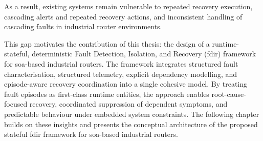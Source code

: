 As a result, existing systems remain vulnerable to repeated recovery execution, cascading alerts and repeated recovery actions, and inconsistent handling of cascading faults in industrial router environments.

This gap motivates the contribution of this thesis: the design of a runtime-stateful, deterministic Fault Detection, Isolation, and Recovery (\gls{fdir}) framework for \gls{soa}-based industrial routers. The framework integrates structured fault characterisation, structured telemetry, explicit dependency modelling, and episode-aware recovery coordination into a single cohesive model. By treating fault episodes as first-class runtime entities, the approach enables root-cause-focused recovery, coordinated suppression of dependent symptoms, and predictable behaviour under embedded system constraints. The following chapter builds on these insights and presents the conceptual architecture of the proposed stateful \gls{fdir} framework for \gls{soa}-based industrial routers.